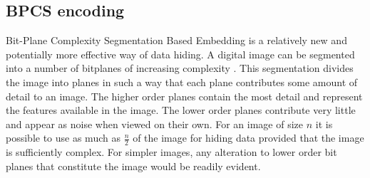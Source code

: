 \subsection{BPCS encoding} Bit-Plane Complexity Segmentation Based Embedding is a relatively new and potentially more effective way of data hiding.  A digital image can be segmented into a number of bitplanes of increasing complexity \cite{kawaguchi1998concept}. This segmentation divides the image into planes in such a way that each plane contributes some amount of detail to an image. The higher order planes contain the most detail and represent the features available in the image. The lower order planes contribute very little and appear as noise when viewed on their own.  For an image of size $n$ it is possible to use as much as $\frac{n}{2}$ of the image for hiding data provided that the image is sufficiently complex. For simpler images, any alteration to lower order bit planes that constitute the image would be readily evident.
